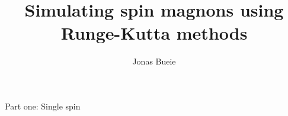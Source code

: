 \documentclass{beamer}
\title{Simulating spin magnons using Runge-Kutta methods}
\author{Jonas Bueie}
\newcommand{\Oh}{\mathcal{O}}
\begin{document}
\frame{\titlepage}


%
%



\begin{frame}
    \vfill
    \centering
    Part one: Single spin 
    \vfill
\end{frame}

\end{document}

